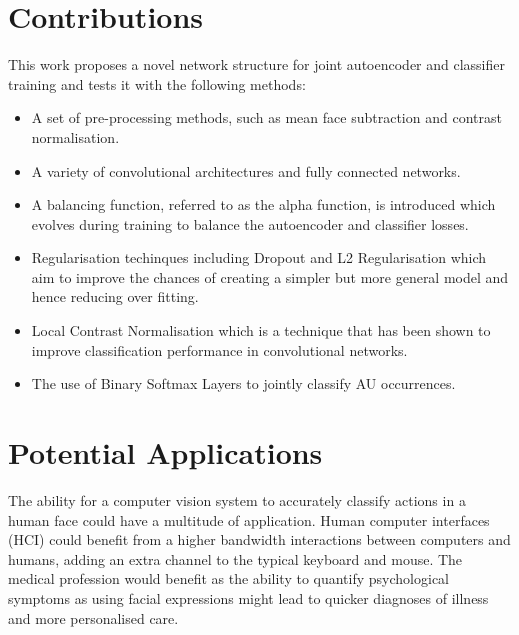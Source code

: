   \section{Contributions}
    This work proposes a novel network structure for joint autoencoder and classifier training and tests it with
    the following methods:
    \begin{itemize}
      \item A set of pre-processing methods, such as mean face subtraction and contrast normalisation.

      \item A variety of convolutional architectures and fully connected networks.

      \item A balancing function, referred to as the alpha function, is introduced which evolves during
            training to balance the autoencoder and classifier losses.

      \item Regularisation techinques including Dropout\cite{Srivastava2014} and L2 Regularisation\cite{Ng2004} which aim to improve the chances
            of creating a simpler but more general model and hence reducing over fitting.

      \item Local Contrast Normalisation\cite{Krizhevsky2012} which is a technique that has been shown to improve classification performance in convolutional networks.

      \item The use of Binary Softmax Layers to jointly classify AU occurrences.

    \end{itemize}

    \section{Potential Applications}
      The ability for a computer vision system to accurately classify actions in a
      human face could have a multitude of application. Human computer interfaces (HCI)
      could benefit from a higher bandwidth interactions between computers and humans, adding
      an extra channel to the typical keyboard and mouse. The medical profession would benefit
      as the ability to quantify psychological symptoms as using facial expressions might lead to
      quicker diagnoses of illness and more personalised care.

